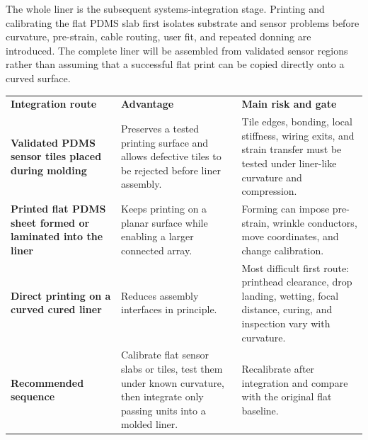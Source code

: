 \hypertarget{q2-whole-liner}{}

{\fontsize{9.65}{11.4}\selectfont
The whole liner is the subsequent systems-integration stage. Printing and calibrating
the flat PDMS slab first isolates substrate and sensor problems before curvature,
pre-strain, cable routing, user fit, and repeated donning are introduced. The
complete liner will be assembled from validated sensor regions rather than
assuming that a successful flat print can be copied directly onto a curved
surface.\par}

\begingroup
\fontsize{8.8}{10.35}\selectfont
\renewcommand{\arraystretch}{1.14}
\begin{tabularx}{\linewidth}{>{\raggedright\arraybackslash\bfseries\color{AUBRed}}p{3.15cm}Y Y}
\color{white}\textbf{Integration route} &
\color{white}\textbf{Advantage} &
\color{white}\textbf{Main risk and gate} \\
Validated PDMS sensor tiles placed during molding & Preserves a tested printing
surface and allows defective tiles to be rejected before liner assembly. &
Tile edges, bonding, local stiffness, wiring exits, and strain transfer must be
tested under liner-like curvature and compression. \\
Printed flat PDMS sheet formed or laminated into the liner & Keeps printing on
a planar surface while enabling a larger connected array. & Forming can impose
pre-strain, wrinkle conductors, move coordinates, and change calibration. \\
Direct printing on a curved cured liner & Reduces assembly interfaces in
principle. & Most difficult first route: printhead clearance, drop landing,
wetting, focal distance, curing, and inspection vary with curvature. \\
Recommended sequence & Calibrate flat sensor slabs or tiles, test them under
known curvature, then integrate only passing units into a molded liner. &
Recalibrate after integration and compare with the original flat baseline. \\
\end{tabularx}
\endgroup
{}

